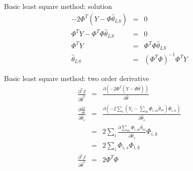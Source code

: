 \begin{frame}{ Basic least square method: solution }
\begin{eqnarray*}
-2\Phi^T(Y-\Phi\hat\theta_{LS}) &=&0\\
\Phi^T Y-\Phi^T\Phi\hat\theta_{LS} &=&0\\
\Phi^T Y &=& \Phi^T\Phi\hat\theta_{LS} \\
\hat\theta_{LS}&=& (\Phi^T\Phi)^{-1}\Phi^T Y 
\end{eqnarray*}
\end{frame}

\begin{frame}{ Basic least square method: two order derivative }
\begin{eqnarray*}
\frac{\partial^2 J}{\partial\hat\theta^2} &=& \frac{\partial (-2\Phi^T(Y-\Phi\hat\theta))}{\partial\hat\theta} \\
\frac{\partial \frac{\partial J}{\partial\hat\theta}}{\partial \hat\theta_s}&=& \frac{\partial (-2\sum_i(Y_i-\sum_m\Phi_{i,m}\hat\theta_m)\Phi_{i,k})}{\partial \hat\theta_s} \\
&=& 2\sum_i\frac{\partial \sum_m\Phi_{i,m}\hat\theta_m}{\partial \hat\theta_s}\Phi_{i,k} \\
&=& 2\sum_i\Phi_{i,s}\Phi_{i,k} \\
\frac{\partial^2 J}{\partial\hat\theta^2} &=& 2\Phi^T\Phi
\end{eqnarray*}
\end{frame}


